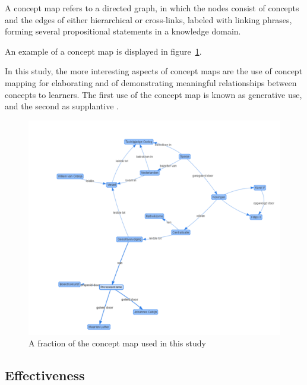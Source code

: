 \begin{definition}
    A concept map refers to a directed graph, in which the nodes consist of concepts and the edges of either hierarchical or cross-links, labeled with linking phrases, forming several propositional statements in a knowledge domain.
\end{definition}

\noindent An example of a concept map is displayed in figure~\ref{fig:examplemap}.

In this study, the more interesting aspects of concept maps are the use of concept mapping for elaborating and of demonstrating meaningful relationships between concepts to learners. The first use of the concept map is known as generative use, and the second as supplantive \cite{instructionaldesign}.

\begin{figure}
    \centering
    \includegraphics[width=\textwidth]{img/conceptmap.png}
    \caption{A fraction of the concept map used in this study}
    \label{fig:examplemap}
\end{figure}

\subsection{Effectiveness}

